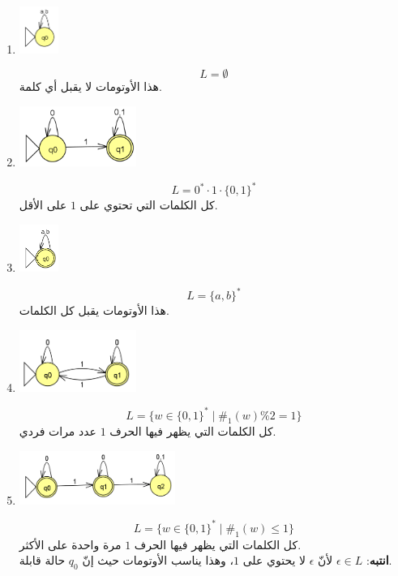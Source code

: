 \documentclass[12pt]{article}
\begin{document}
\begin{enumerate}[itemsep=3em]
\begin{enumerate}
\item
\includegraphics[width=0.1\textwidth]{../../../images/DFAs/ex1_q8.png}\\
\ifwithsols
\begin{solution}
\[ L = \emptyset \]
هذا الأوتومات لا يقبل أي كلمة.
\end{solution}
\fi

\item
\includegraphics[width=0.3\textwidth]{../../../images/DFAs/ex1_q9.png}\\
\ifwithsols
\begin{solution}
\[ L = 0^* \cdot 1 \cdot \{0, 1\}^* \]
كل الكلمات التي تحتوي على $1$ على الأقل.
\end{solution}
\fi

\item
\includegraphics[width=0.1\textwidth]{../../../images/DFAs/ex1_q10.png}
\ifwithsols
\begin{solution}
\[ L = \{a, b\}^* \]
هذا الأوتومات يقبل كل الكلمات.
\end{solution}
\fi

\item
\includegraphics[width=0.3\textwidth]{../../../images/DFAs/ex1_q11.png}
\ifwithsols
\begin{solution}
\[ L = \{ w \in \{0, 1\}^* \mid \#_1(w) \% 2 = 1 \} \]
كل الكلمات التي يظهر فيها الحرف $1$ عدد مرات فردي.
\end{solution}
\fi

\item
\includegraphics[width=0.4\textwidth]{../../../images/DFAs/ex1_q12.png}
\ifwithsols
\begin{solution}
\[ L = \{ w \in \{0, 1\}^* \mid \#_1(w) \leq 1 \} \]
كل الكلمات التي يظهر فيها الحرف $1$ مرة واحدة على الأكثر. \\
\textbf{انتبه}: $\epsilon \in L$ لأنّ $\epsilon$ لا يحتوي على $1$، وهذا يناسب الأوتومات حيث إنّ $q_0$ حالة قابلة.
\end{solution}
\fi


\end{enumerate}
\end{enumerate}
\end{document}
